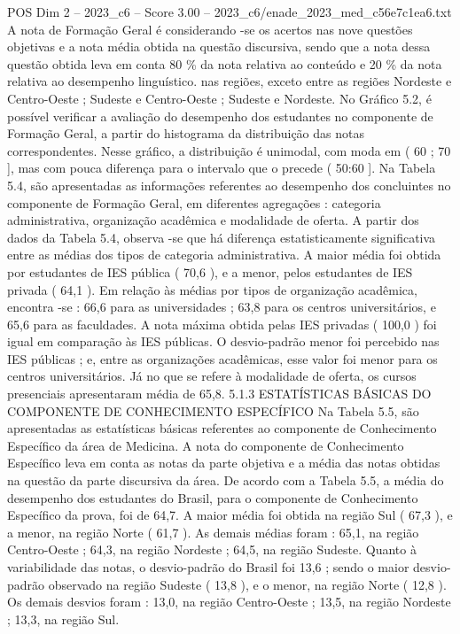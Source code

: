 \begin{textsample}{POS Dim 2 – 2023\_c6 – Score 3.00 – 2023\_c6/enade\_2023\_med\_c56e7c1ea6.txt}
A nota de Formação Geral é considerando -se os acertos nas nove questões objetivas e a nota média obtida na questão discursiva, sendo que a nota dessa questão obtida leva em conta 80 \% da nota relativa ao conteúdo e 20 \% da nota relativa ao desempenho linguístico. nas regiões, exceto entre as regiões Nordeste e Centro-Oeste ; Sudeste e Centro-Oeste ; Sudeste e Nordeste.
No Gráfico 5.2, é possível verificar a avaliação do desempenho dos estudantes no componente de Formação Geral, a partir do histograma da distribuição das notas correspondentes.
Nesse gráfico, a distribuição é unimodal, com moda em ( 60 ; 70 ], mas com pouca diferença para o intervalo que o precede ( 50:60 ].
Na Tabela 5.4, são apresentadas as informações referentes ao desempenho dos concluintes no componente de Formação Geral, em diferentes agregações : categoria administrativa, organização acadêmica e modalidade de oferta.
A partir dos dados da Tabela 5.4, observa -se que há diferença estatisticamente significativa entre as médias dos tipos de categoria administrativa.
A maior média foi obtida por estudantes de IES pública ( 70,6 ), e a menor, pelos estudantes de IES privada ( 64,1 ).
Em relação às médias por tipos de organização acadêmica, encontra -se : 66,6 para as universidades ; 63,8 para os centros universitários, e 65,6 para as faculdades.
A nota máxima obtida pelas IES privadas ( 100,0 ) foi igual em comparação às IES públicas.
O desvio-padrão menor foi percebido nas IES públicas ; e, entre as organizações acadêmicas, esse valor foi menor para os centros universitários.
Já no que se refere à modalidade de oferta, os cursos presenciais apresentaram média de 65,8. 5.1.3 ESTATÍSTICAS BÁSICAS DO COMPONENTE DE CONHECIMENTO ESPECÍFICO Na Tabela 5.5, são apresentadas as estatísticas básicas referentes ao componente de Conhecimento Específico da área de Medicina.
A nota do componente de Conhecimento Específico leva em conta as notas da parte objetiva e a média das notas obtidas na questão da parte discursiva da área.
De acordo com a Tabela 5.5, a média do desempenho dos estudantes do Brasil, para o componente de Conhecimento Específico da prova, foi de 64,7.
A maior média foi obtida na região Sul ( 67,3 ), e a menor, na região Norte ( 61,7 ).
As demais médias foram : 65,1, na região Centro-Oeste ; 64,3, na região Nordeste ; 64,5, na região Sudeste.
Quanto à variabilidade das notas, o desvio-padrão do Brasil foi 13,6 ; sendo o maior desvio-padrão observado na região Sudeste ( 13,8 ), e o menor, na região Norte ( 12,8 ).
Os demais desvios foram : 13,0, na região Centro-Oeste ; 13,5, na região Nordeste ; 13,3, na região Sul.

\end{textsample}
